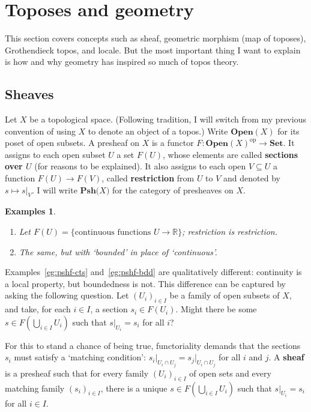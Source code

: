\documentclass[12pt]{article}
\newcommand{\fcat}[1]{\mathbf{#1}}
\newcommand{\op}{\mathrm{op}}
\newcommand{\Set}{\fcat{Set}}
\newcommand{\reals}{\mathbb{R}}
\newcommand{\demph}[1]{\textbf{\textup{#1}}}
\newcommand{\sub}{\subseteq}
\newcommand{\chunk}[1]{\subsection*{#1}}
\newcommand{\Pshf}[1]{\fcat{Psh}{#1}}
\newcommand{\Open}{\fcat{Open}}
\newcommand{\restr}[1]{\vert_{#1}}
\newcommand{\cln}{\colon}
\newtheorem{preexamples}[thm]{Examples}
\newenvironment{examples}{\begin{preexamples}\upshape}{\end{preexamples}}
\begin{document}
\section{Toposes and geometry}
\label{sec:geom}



This section covers concepts such as sheaf, geometric morphism (map of
toposes), Grothendieck topos, and locale.  But the most important thing I
want to explain is how and why geometry has inspired so much of topos theory.

\chunk{Sheaves}

Let $X$ be a topological space.  (Following tradition, I will switch from my
previous convention of using $X$ to denote an object of a topos.)  Write
$\Open(X)$ for its poset of open subsets.  A presheaf on $X$ is a functor
$F\cln \Open(X)^\op \to \Set$.  It assigns to each open subset $U$ a set
$F(U)$, whose elements are called \demph{sections over $U$} (for reasons to be
explained).  It also assigns to each open $V \sub U$ a function $F(U) \to
F(V)$, called \demph{restriction} from $U$ to $V$ and denoted by $s \mapsto
s\restr{V}$.  I will write $\Pshf(X)$ for the category of presheaves on $X$.

\begin{examples}
\begin{enumerate}
\item   \label{eg:pshf-cts}
Let $F(U) = \{\text{continuous functions } U \to \reals\}$; restriction
is restriction.
\item   \label{eg:pshf-bdd}
The same, but with `bounded' in place of `continuous'.
\end{enumerate}
\end{examples}

Examples~\eqref{eg:pshf-cts} and~\eqref{eg:pshf-bdd} are qualitatively
different: continuity is a local property, but boundedness is not.  This
difference can be captured by asking the following question.  Let $(U_i)_{i
\in I}$ be a family of open subsets of $X$, and take, for each $i \in I$, a
section $s_i \in F(U_i)$.  Might there be some $s \in F(\bigcup_{i \in I}
U_i)$ such that $s\restr{U_i} = s_i$ for all $i$?

For this to stand a chance of being true, functoriality demands that the
sections $s_i$ must satisfy a `matching condition': $s_i\restr{U_i \cap U_j} =
s_j\restr{U_i \cap U_j}$ for all $i$ and $j$.  A \demph{sheaf} is a presheaf
such that for every family $(U_i)_{i \in I}$ of open sets and every matching
family $(s_i)_{i \in I}$, there is a unique $s \in F(\bigcup_{i \in I} U_i)$
such that $s\restr{U_i} = s_i$ for all $i \in I$.
\end{document}
